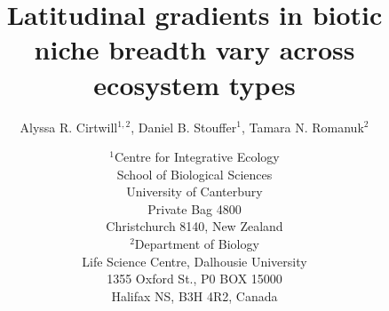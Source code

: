 \documentclass[12pt]{article}
\begin{document}
\title{Latitudinal gradients in biotic niche breadth vary across ecosystem types}
\author{Alyssa R. Cirtwill$^{1,2}$, Daniel B. Stouffer$^{1}$, Tamara N. Romanuk$^{2}$}
\date{\small$^1$Centre for Integrative Ecology\\School of Biological Sciences\\University of Canterbury\\
Private Bag 4800\\Christchurch 8140, New Zealand \\
\medskip$^2$Department of Biology\\
Life Science Centre, Dalhousie University\\1355 Oxford St., P0 BOX 15000\\
Halifax NS, B3H 4R2, Canada\\}

\maketitle
\baselineskip=8.5mm
 
\vspace{-0.3 in}
\end{document}
